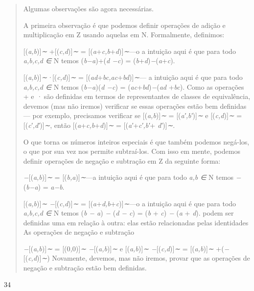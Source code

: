 \documentclass[
]{article}
\begin{document}
\begin{quote}
Algumas observações são agora necessárias.

A primeira observação é que podemos definir operações de adição e
multiplicação em Z usando aquelas em N. Formalmente, definimos:

{[}(\emph{a,b}){]}\emph{∼} +{[}(\emph{c,d}){]}\emph{∼} =
{[}(\emph{a}+\emph{c,b}+\emph{d}){]}\emph{∼}---o a intuição aqui é que
para todo \emph{a,b,c,d ∈} N temos (\emph{b−a})+(\emph{d −c}) =
(\emph{b}+\emph{d})\emph{−}(\emph{a}+\emph{c}).

{[}(\emph{a,b}){]}\emph{∼·}{[}(\emph{c,d}){]}\emph{∼} =
{[}(\emph{ad}+\emph{bc,ac}+\emph{bd}){]}\emph{∼}--- a intuição aqui é
que para todo \emph{a,b,c,d ∈} N temos (\emph{b−a})(\emph{d −c}) =
(\emph{ac}+\emph{bd})\emph{−}(\emph{ad} +\emph{bc}). Como as operações +
e \emph{·} são definidas em termos de representantes de classes de
equivalência, devemos (mas não iremos) verificar se essas operações
estão bem definidas --- por exemplo, precisamos verificar se
{[}(\emph{a,b}){]}\emph{∼} = {[}(\emph{a′,b′}){]}\emph{∼} e
{[}(\emph{c,d}){]}\emph{∼} = {[}(\emph{c′,d′}){]}\emph{∼}, então
{[}(\emph{a}+\emph{c,b}+\emph{d}){]}\emph{∼} =
{[}(\emph{a′}+\emph{c′,b′}+ \emph{d′}){]}\emph{∼}.

O que torna os números inteiros especiais é que também podemos negá-los,
o que por sua vez nos permite subtraí-los. Com isso em mente, podemos
definir operações de negação e subtração em Z da seguinte forma:

\emph{−}{[}(\emph{a,b}){]}\emph{∼} = {[}(\emph{b,a}){]}\emph{∼}---a
intuição aqui é que para todo \emph{a,b ∈} N temos \emph{−}(\emph{b−a})
= \emph{a−b}.

{[}(\emph{a,b}){]}\emph{∼ −}{[}(\emph{c,d}){]}\emph{∼} =
{[}(\emph{a}+\emph{d,b}+\emph{c}){]}\emph{∼}---o a intuição aqui é que
para todo \emph{a,b,c,d ∈} N temos (\emph{b − a}) \emph{−} (\emph{d −
c}) = (\emph{b} + \emph{c}) \emph{−} (\emph{a} + \emph{d}). podem ser
definidas uma em relação à outra: elas estão relacionadas pelas
identidades As operações de negação e subtração

\emph{−}{[}(\emph{a,b}){]}\emph{∼} = {[}(0\emph{,}0){]}\emph{∼
−}{[}(\emph{a,b}){]}\emph{∼} e {[}(\emph{a,b}){]}\emph{∼
−}{[}(\emph{c,d}){]}\emph{∼} = {[}(\emph{a,b}){]}\emph{∼}
+(\emph{−}{[}(\emph{c,d}){]}\emph{∼}) Novamente, devemos, mas não
iremos, provar que as operações de negação e subtração estão bem
definidas.
\end{quote}

34
\end{document}
